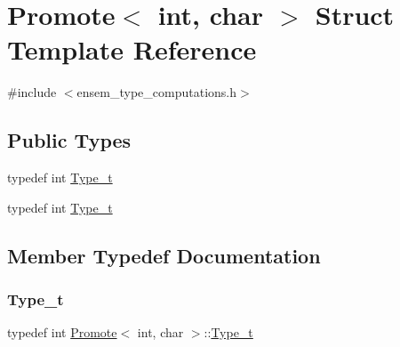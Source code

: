 \hypertarget{structPromote_3_01int_00_01char_01_4}{}\section{Promote$<$ int, char $>$ Struct Template Reference}
\label{structPromote_3_01int_00_01char_01_4}


{\ttfamily \#include $<$ensem\+\_\+type\+\_\+computations.\+h$>$}

\subsection*{Public Types}
\begin{DoxyCompactItemize}
\item 
typedef int \mbox{\hyperlink{structPromote_3_01int_00_01char_01_4_a0e318e07696fbce55dd03513e6452a2c}{Type\+\_\+t}}
\item 
typedef int \mbox{\hyperlink{structPromote_3_01int_00_01char_01_4_a0e318e07696fbce55dd03513e6452a2c}{Type\+\_\+t}}
\end{DoxyCompactItemize}


\subsection{Member Typedef Documentation}
\mbox{\label{structPromote_3_01int_00_01char_01_4_a0e318e07696fbce55dd03513e6452a2c}} 
\subsubsection{\texorpdfstring{Type\_t}{Type\_t}\hspace{0.1cm}{\footnotesize\ttfamily [1/2]}}
{\footnotesize\ttfamily typedef int \mbox{\hyperlink{structPromote}{Promote}}$<$ int, char $>$\+::\mbox{\hyperlink{structPromote_3_01int_00_01char_01_4_a0e318e07696fbce55dd03513e6452a2c}{Type\+\_\+t}}}

\mbox{\label{structPromote_3_01int_00_01char_01_4_a0e318e07696fbce55dd03513e6452a2c}} 
